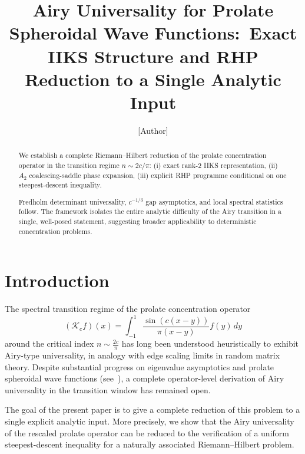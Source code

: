 \documentclass[12pt,a4paper]{amsart}
\theoremstyle{definition}
\theoremstyle{remark}
\newcommand{\Kc}{\mathcal{K}_c}
\begin{document}
\title[Operator Universality for the PSWF Transition Regime]{%
  Airy Universality for Prolate Spheroidal Wave Functions:\
  Exact IIKS Structure and RHP Reduction to a Single Analytic Input}

\author{[Author]}
\address{[Address]}
\email{[Email]}

\begin{abstract}
We establish a complete Riemann--Hilbert reduction of the prolate
concentration operator in the transition regime $n\sim 2c/\pi$:
(i) exact rank-2 IIKS representation, (ii) $A_2$ coalescing-saddle
phase expansion, (iii) explicit RHP programme conditional on one
steepest-descent inequality.

Fredholm determinant universality, $c^{-1/3}$ gap asymptotics, and
local spectral statistics follow. The framework isolates the entire
analytic difficulty of the Airy transition in a single, well-posed
statement, suggesting broader applicability to deterministic
concentration problems.
\end{abstract}

\maketitle

\section{Introduction}
\label{sec:intro}

The spectral transition regime of the prolate concentration operator
\[
  (\Kc f)(x) = \int_{-1}^1 \frac{\sin(c(x-y))}{\pi(x-y)} f(y)\,dy
\]
around the critical index $n \sim \frac{2c}{\pi}$ has long been
understood heuristically to exhibit Airy-type universality,
in analogy with edge scaling limits in random matrix theory.
Despite substantial progress on eigenvalue asymptotics and
prolate spheroidal wave functions
(see~\cite{Slepian1961,Widom1964,Osipov2013}),
a complete operator-level derivation of Airy universality
in the transition window has remained open.

The goal of the present paper is to give a complete reduction of this
problem to a single explicit analytic input.
More precisely, we show that the Airy universality of the rescaled
prolate operator can be reduced to the verification of a uniform
steepest-descent inequality for a naturally associated
Riemann--Hilbert problem.
\end{document}
